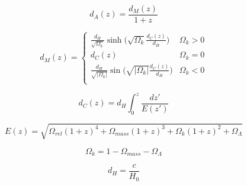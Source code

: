 \documentclass[11pt,letterpaper]{article}
\begin{document}
\begin{equation}
d_A(z) = \frac{d_M(z)}{1+z}
\end{equation}	

\begin{equation}
	d_M(z) = \left\{ \begin{array}{ll}
	\frac{d_H}{\sqrt{\Omega_k}}\sinh\Big({\sqrt{\Omega_k}\frac{d_C(z)}{d_H}}\Big) & \Omega_k > 0 \\
	d_C(z) & \Omega_k = 0 \\
	\frac{d_H}{\sqrt{|\Omega_k|}}\sin\Big({\sqrt{|\Omega_k|}\frac{d_C(z)}{d_H}}\Big) & \Omega_k < 0 \\
	\end{array} \right.	 
\end{equation}	

\begin{equation}
	d_C(z) = d_H\int_{0}^{z} \frac{dz'}{E(z')}
\end{equation}

\begin{equation}
	E(z) = \sqrt{\Omega_{rel}(1+z)^4+\Omega_{mass}(1+z)^3+\Omega_k(1+z)^2+\Omega_{\Lambda}}
\end{equation}

\begin{equation}
	\Omega_k = 1-\Omega_{mass}-\Omega_{\Lambda} 
\end{equation}

\begin{equation}
	d_H = \frac{c}{H_0}
\end{equation}
\end{document}
